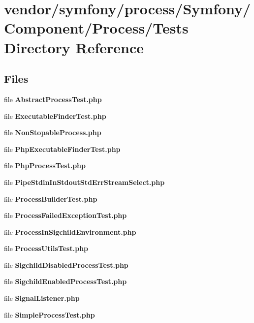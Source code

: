 \section{vendor/symfony/process/\+Symfony/\+Component/\+Process/\+Tests Directory Reference}
\label{dir_0a8431f0df366a7cd3bcac3c3a564533}
\subsection*{Files}
\begin{DoxyCompactItemize}
\item 
file {\bf Abstract\+Process\+Test.\+php}
\item 
file {\bf Executable\+Finder\+Test.\+php}
\item 
file {\bf Non\+Stopable\+Process.\+php}
\item 
file {\bf Php\+Executable\+Finder\+Test.\+php}
\item 
file {\bf Php\+Process\+Test.\+php}
\item 
file {\bf Pipe\+Stdin\+In\+Stdout\+Std\+Err\+Stream\+Select.\+php}
\item 
file {\bf Process\+Builder\+Test.\+php}
\item 
file {\bf Process\+Failed\+Exception\+Test.\+php}
\item 
file {\bf Process\+In\+Sigchild\+Environment.\+php}
\item 
file {\bf Process\+Utils\+Test.\+php}
\item 
file {\bf Sigchild\+Disabled\+Process\+Test.\+php}
\item 
file {\bf Sigchild\+Enabled\+Process\+Test.\+php}
\item 
file {\bf Signal\+Listener.\+php}
\item 
file {\bf Simple\+Process\+Test.\+php}
\end{DoxyCompactItemize}
